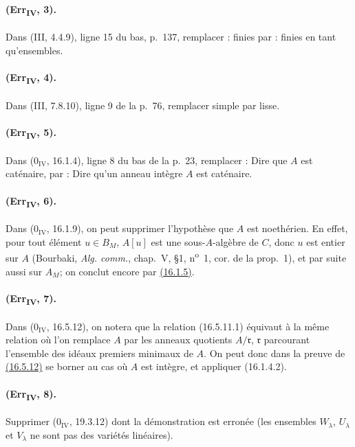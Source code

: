 \paragraph{(Err\textsubscript{IV}, 3).}
Dans (III, 4.4.9), ligne 15 du bas, p.~137, remplacer : finies par :
finies en tant qu'ensembles.

\paragraph{(Err\textsubscript{IV}, 4).}
Dans (III, 7.8.10), ligne 9 de la p.~76, remplacer simple par lisse.

\paragraph{(Err\textsubscript{IV}, 5).}
Dans ($0_{\mathrm{IV}}$, 16.1.4), ligne 8 du bas de la p.~23, remplacer :
Dire que $A$ est caténaire, par : Dire qu'un anneau intègre $A$ est
caténaire.

\paragraph{(Err\textsubscript{IV}, 6).}
Dans ($0_{\mathrm{IV}}$, 16.1.9), on peut supprimer l'hypothèse que
$A$ est noethérien. En effet, pour tout élément $u\in B_M$, $A[u]$
est une sous-$A$-algèbre de $C$, donc $u$ est entier sur $A$ (Bourbaki,
\emph{Alg. comm.}, chap.~V, \S1, n\textsuperscript{o}~1, cor. de la
prop.~1), et par suite aussi sur $A_M$; on conclut encore par
{\hyperlink{ega4.c04.prop.16-1-5}{(16.1.5)}}.

\paragraph{(Err\textsubscript{IV}, 7).}
Dans ($0_{\mathrm{IV}}$, 16.5.12), on notera que la relation
(16.5.11.1) équivaut à la même relation où l'on remplace $A$ par les
anneaux quotients $A/\mathfrak r$, $\mathfrak r$ parcourant l'ensemble
des idéaux premiers minimaux de $A$. On peut donc dans la preuve de
{\hyperlink{ega4.c04.statement.16-5-12}{(16.5.12)}} se borner au cas
où $A$ est intègre, et appliquer (16.1.4.2).

\paragraph{(Err\textsubscript{IV}, 8).}
Supprimer ($0_{\mathrm{IV}}$, 19.3.12) dont la démonstration est erronée
(les ensembles $W_\lambda$, $U_\lambda$ et $V_\lambda$ ne sont pas des
variétés linéaires).

